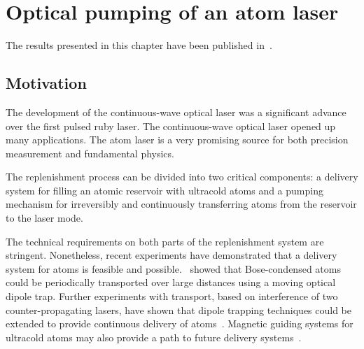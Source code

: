 \chapter{Optical pumping of an atom laser}
\label{OpticalPumping}
\graphicspath{{Figures/OpticalPumping/}{Figures/Common/}}

The results presented in this chapter have been published in~\citet{Robins:2008,Doring:2009}.

\section{Motivation}

The development of the continuous-wave optical laser was a significant advance over the first pulsed ruby laser. The continuous-wave optical laser opened up many applications. The atom laser is a very promising source for both precision measurement and fundamental physics.

The replenishment process can be divided into two critical components: a delivery system for filling an atomic reservoir with ultracold atoms and a pumping mechanism for irreversibly and continuously transferring atoms from the reservoir to the laser mode.

The technical requirements on both parts of the replenishment system are stringent. Nonetheless, recent experiments have demonstrated that a delivery system for atoms is feasible and possible.~\citet{Chikkatur:2002qa} showed that Bose-condensed atoms could be periodically transported over large distances using a moving optical dipole trap. Further experiments with transport, based on interference of two counter-propagating lasers, have shown that dipole trapping techniques could be extended to provide continuous delivery of atoms~\citep{Schmid:2006}. Magnetic guiding systems for ultracold atoms may also provide a path to future delivery systems~\citep{Lahaye:2004,Greiner:2001,Greiner:2007}.

